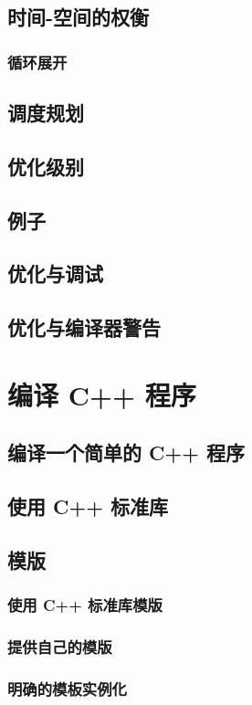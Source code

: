 \documentclass[lang=cn,10pt,newtx,scheme=chinese]{elegantbook}
\begin{document}
\section{时间-空间的权衡}
\subsection{循环展开}
\section{调度规划}
\section{优化级别}
\section{例子}
\section{优化与调试}
\section{优化与编译器警告}

\chapter{编译 C++ 程序}
\section{编译一个简单的 C++ 程序}
\section{使用 C++ 标准库}
\section{模版}
\subsection{使用 C++ 标准库模版}
\subsection{提供自己的模版}
\subsection{明确的模板实例化}
\end{document}
